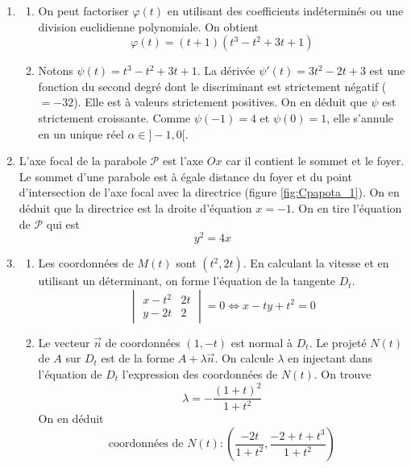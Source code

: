 \begin{enumerate}
 \item
\begin{enumerate}
 \item On peut factoriser $\varphi(t)$ en utilisant des coefficients indéterminés ou une division euclidienne polynomiale. On obtient
\begin{displaymath}
 \varphi(t) = (t+1)(t^3-t^2+3t+1)
\end{displaymath}

 \item Notons $\psi(t) = t^3-t^2+3t+1$. La dérivée $\psi'(t) =3t^2-2t+3$ est une fonction du second degré dont le discriminant est strictement négatif ($=-32$). Elle est à valeurs strictement positives. On en déduit que $\psi$ est strictement croissante. Comme $\psi(-1)=4$ et $\psi(0)=1$, elle s'annule en un unique réel $\alpha\in ]-1,0[$. 
\end{enumerate}
 
 \item L'axe focal de la parabole $\mathcal P$ est l'axe $Ox$ car il contient le sommet et le foyer. Le sommet d'une parabole est à égale distance du foyer et du point d'intersection de l'axe focal avec la directrice (figure \ref{fig:Cpapota_1}). On en déduit que la directrice est la droite d'équation $x=-1$. On en tire l'équation de $\mathcal{P}$ qui est
\begin{displaymath}
 y^2 = 4x
\end{displaymath}

 \item 
\begin{enumerate}
 \item Les coordonnées de $M(t)$ sont $(t^2,2t)$. En calculant la vitesse et en utilisant un déterminant, on forme l'équation de la tangente $D_t$.
\begin{displaymath}
 \begin{vmatrix}
  x-t^2 & 2t \\y-2t & 2
 \end{vmatrix}
=0
\Leftrightarrow
x-ty+t^2 = 0
\end{displaymath}

 \item Le vecteur $\overrightarrow n$ de coordonnées $(1,-t)$ est normal à $D_t$. Le projeté $N(t)$ de $A$ sur $D_t$ est de la forme $A+\lambda \overrightarrow n$. On calcule $\lambda$ en injectant dans l'équation de $D_t$ l'expression des coordonnées de $N(t)$. On trouve
\begin{displaymath}
 \lambda = -\frac{(1+t)^2}{1+t^2}
\end{displaymath}
On en déduit
\begin{displaymath}
 \text{coordonnées de }N(t):
\left(\frac{-2t}{1+t^2} ,\frac{-2+t+t^3}{1+t^2}\right) 
\end{displaymath}
\end{enumerate}


\end{enumerate}

